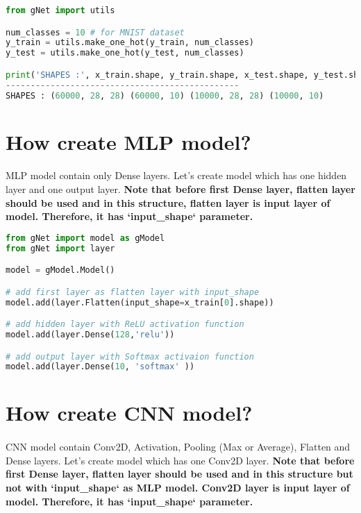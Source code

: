 \documentclass[12pt]{report}
\begin{document}
\begin{lstlisting}[language=Python, numbers=none, caption={Making one-hot vector of label of dataset.}, label={ex:make-one-hot}]
from gNet import utils

num_classes = 10 # for MNIST dataset
y_train = utils.make_one_hot(y_train, num_classes)
y_test = utils.make_one_hot(y_test, num_classes)

print('SHAPES :', x_train.shape, y_train.shape, x_test.shape, y_test.shape)
-----------------------------------------------
SHAPES : (60000, 28, 28) (60000, 10) (10000, 28, 28) (10000, 10)
\end{lstlisting}



\section{How create MLP model?}
\paragraph{}
MLP model contain only Dense layers. Let's create model which has one hidden layer and one output layer. \textbf{Note that before first Dense layer, flatten layer should be used and in this structure, flatten layer is input layer of model. Therefore, it has `input\_shape` parameter.}


\begin{lstlisting}[language=Python, numbers=none, caption={Create MLP model.}, label={ex:create-mlp-model}]
from gNet import model as gModel
from gNet import layer

model = gModel.Model()

# add first layer as flatten layer with input_shape
model.add(layer.Flatten(input_shape=x_train[0].shape))

# add hidden layer with ReLU activation function
model.add(layer.Dense(128,'relu'))

# add output layer with Softmax activaion function 
model.add(layer.Dense(10, 'softmax' ))
\end{lstlisting}



\section{How create CNN model?}
\paragraph{}
CNN model contain Conv2D, Activation, Pooling (Max or Average), Flatten and Dense layers. Let's create model which has one Conv2D layer. \textbf{Note that before first Dense layer, flatten layer should be used and in this structure but not with `input\_shape` as MLP model. Conv2D layer is input layer of model. Therefore, it has `input\_shape` parameter.}
\end{document}

